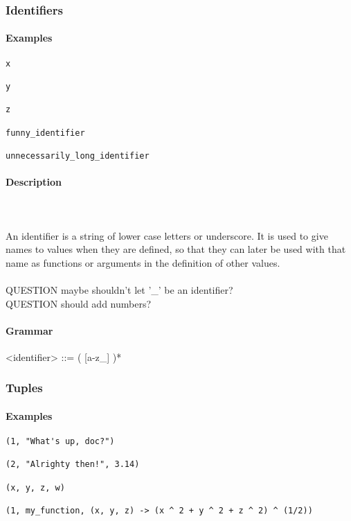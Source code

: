 \documentclass{article}
\def\pend{\mbox{} \\\\}
\begin{document}
\subsubsection{Identifiers}

\paragraph{Examples}

\begin{verbatim}
x

y

z 

funny_identifier 

unnecessarily_long_identifier
\end{verbatim}

\paragraph{Description}\pend
An identifier is a string of lower case letters or underscore. It is used to give
names to values when they are defined, so that they can later be used with that 
name as functions or arguments in the definition of other values.
\\\\
QUESTION maybe shouldn't let '\_' be an identifier?  \\
QUESTION should add numbers?

\paragraph{Grammar}
\begin{grammar}
<identifier> ::= ( [a-z_] )*
\end{grammar}

\newpage
\subsubsection{Tuples}

\paragraph{Examples}

\begin{verbatim}
(1, "What's up, doc?")

(2, "Alrighty then!", 3.14)

(x, y, z, w)

(1, my_function, (x, y, z) -> (x ^ 2 + y ^ 2 + z ^ 2) ^ (1/2))
\end{verbatim}
\end{document}
